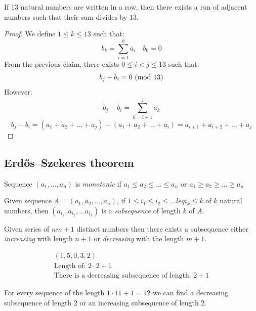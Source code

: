 \documentclass[00_complete]{subfiles}
\begin{document}
\begin{claim}
    If $13$ natural numbers are written in a row, then there exists a run of
    adjacent numbers such that their sum divides by $13$.
\end{claim}
\begin{proof}
    We define $1\leq k \leq 13$ such that:
    $$b_k=\sum_{i=1}^{k}a_i \quad b_{0}=0$$
    From the previous claim, there exists $0 \leq i<j \leq 13$ such that:
    $$b_j-b_i=0\ (\mathrm{mod}\ 13)$$
    However:
    $$b_j-b_i = \sum_{k=i+1}^{j}a_k$$
    $$b_j-b_i=(a_1+a_2+\dots+a_j)-(a_1+a_2+\dots+a_i)=a_{i+1}+a_{i+2}+ \dots + a_j$$
\end{proof}
\subsection{Erd\H{o}s–Szekeres theorem}
\begin{definition}
    Sequence $(a_1,\dots,a_n)$ is \emph{monotonic} if $a_1 \leq a_2 \leq \dots
    \leq a_n$ or $a_1 \geq a_2 \geq \dots \geq a_n$

    Given sequence $A=(a_1,a_2,\dots,a_n)$, if $1 \leq i_1 \leq i_2 \leq \dots
    leq i_k \leq k$ of $k$ natural numbers, then $(a_{i_1}, a_{i_2}, \dots
    a_{i_k})$ is a \emph{subsequence} of length $k$ of $A$.

    Given series of $nm+1$ distinct numbers then there exists a subsequence
    either \emph{increasing} with length $n+1$ or \emph{decreasing} with the
    length $m+1$.
\end{definition}
\begin{example}
    $$
    \begin{gathered}
        (1,5,0,3,2) \\
        \text{Length of: } 2 \cdot 2 + 1 \\
        \text{There is a decreasing subsequence of length: } 2+1
    \end{gathered}
    $$
\end{example}
\begin{conclusion}
    For every sequence of the length $1\cdot 11 + 1 = 12$ we can find a
    decreasing subsequence of length $2$ or an increasing subsequence of length
    $2$.
\end{conclusion}
\end{document}
